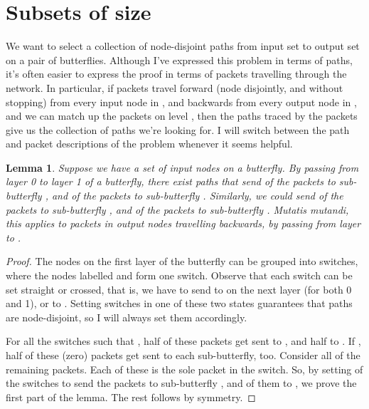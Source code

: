 \documentclass[12pt]{article}
\newtheorem{lemma}{Lemma}
\begin{document}
\section{Subsets of size }
We want to select a collection of node-disjoint paths from input set 
to output set  on a pair of butterflies.
Although I've expressed this problem in terms of paths, it's often easier
to express the proof in terms of packets travelling through the network.
In particular, if packets travel forward (node disjointly, and
without stopping) from every input node in ,
and backwards from every output node in , and we can match up the 
packets on level , then the paths traced by the packets give us the
collection of paths we're looking for.  I will switch between the path
and packet descriptions of the problem whenever it seems helpful.
\begin{lemma} \label{simple splitting}
Suppose we have a set  of input nodes on a butterfly.
By passing from layer 0 to layer 1 of a butterfly, there exist
paths that send
 of the packets to sub-butterfly , and 
 of the packets to sub-butterfly .
Similarly, we could send 
 of the packets to sub-butterfly , and 
 of the packets to sub-butterfly .
Mutatis mutandi, this applies to packets in output nodes
travelling backwards, by passing from layer  to .
\end{lemma}
\begin{proof}
The  nodes on the first layer of the butterfly can be grouped into 
 switches, where the nodes labelled 
and  form one switch.  Observe that 
each switch can be set straight or crossed, that is, 
we have to send  to  on the next layer 
(for  both 0 and 1), or  to .  Setting switches in one of 
these two states guarantees that paths are node-disjoint, so I 
will always set them accordingly. 

	For all the switches such that , half
of these packets get sent to , and half to .  If 
, half of these (zero) packets get sent
to each sub-butterfly, too.  Consider all of the remaining
packets.  Each of these is the sole packet in the switch.  So,
by setting  of the switches to send the
packets to sub-butterfly , and  of them 
to , we prove the first part of the lemma.  The rest
follows by symmetry. \end{proof}
\end{document}
